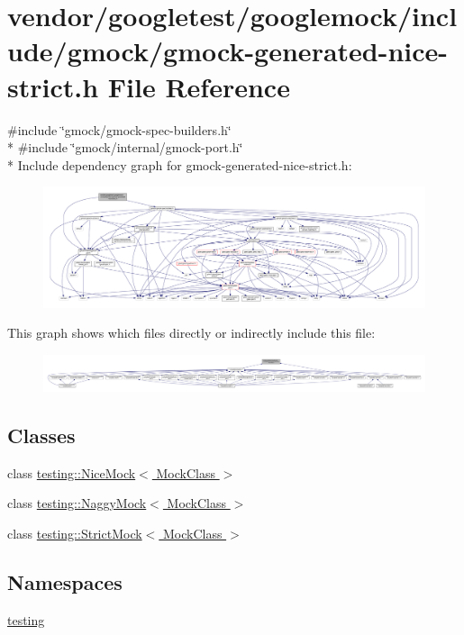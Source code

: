 \hypertarget{gmock-generated-nice-strict_8h}{}\section{vendor/googletest/googlemock/include/gmock/gmock-\/generated-\/nice-\/strict.h File Reference}
\label{gmock-generated-nice-strict_8h}
{\ttfamily \#include \char`\"{}gmock/gmock-\/spec-\/builders.\+h\char`\"{}}\\*
{\ttfamily \#include \char`\"{}gmock/internal/gmock-\/port.\+h\char`\"{}}\\*
Include dependency graph for gmock-\/generated-\/nice-\/strict.h\+:\nopagebreak
\begin{figure}[H]
\begin{center}
\leavevmode
\includegraphics[width=350pt]{gmock-generated-nice-strict_8h__incl}
\end{center}
\end{figure}
This graph shows which files directly or indirectly include this file\+:\nopagebreak
\begin{figure}[H]
\begin{center}
\leavevmode
\includegraphics[width=350pt]{gmock-generated-nice-strict_8h__dep__incl}
\end{center}
\end{figure}
\subsection*{Classes}
\begin{DoxyCompactItemize}
\item 
class \hyperlink{classtesting_1_1NiceMock}{testing\+::\+Nice\+Mock$<$ Mock\+Class $>$}
\item 
class \hyperlink{classtesting_1_1NaggyMock}{testing\+::\+Naggy\+Mock$<$ Mock\+Class $>$}
\item 
class \hyperlink{classtesting_1_1StrictMock}{testing\+::\+Strict\+Mock$<$ Mock\+Class $>$}
\end{DoxyCompactItemize}
\subsection*{Namespaces}
\begin{DoxyCompactItemize}
\item 
 \hyperlink{namespacetesting}{testing}
\end{DoxyCompactItemize}
